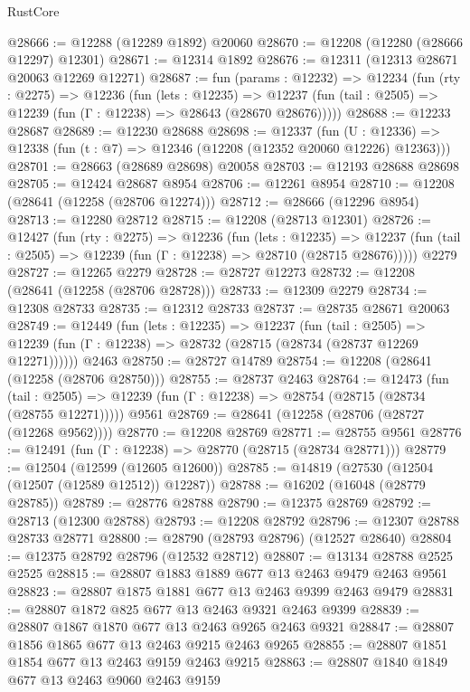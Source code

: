 \begin{lexlean}{RustCore}
\begin{coremodule}
@28666 := @12288 (@12289 @1892) @20060
@28670 := @12208 (@12280 (@28666 @12297) @12301)
@28671 := @12314 @1892
@28676 := @12311 (@12313 @28671 @20063 @12269 @12271)
@28687 := fun (params : @12232) =>
  @12234
    (fun (rty : @2275) =>
    @12236
      (fun (lets : @12235) =>
      @12237 (fun (tail : @2505) => @12239 (fun (Γ : @12238) => @28643 (@28670 @28676)))))
@28688 := @12233 @28687
@28689 := @12230 @28688
@28698 := @12337
    (fun (U : @12336) => @12338 (fun (t : @7) => @12346 (@12208 (@12352 @20060 @12226) @12363)))
@28701 := @28663 (@28689 @28698) @20058
@28703 := @12193 @28688 @28698
@28705 := @12424 @28687 @8954
@28706 := @12261 @8954
@28710 := @12208 (@28641 (@12258 (@28706 @12274)))
@28712 := @28666 (@12296 @8954)
@28713 := @12280 @28712
@28715 := @12208 (@28713 @12301)
@28726 := @12427
    (fun (rty : @2275) =>
    @12236
      (fun (lets : @12235) =>
      @12237 (fun (tail : @2505) => @12239 (fun (Γ : @12238) => @28710 (@28715 @28676)))))
    @2279
@28727 := @12265 @2279
@28728 := @28727 @12273
@28732 := @12208 (@28641 (@12258 (@28706 @28728)))
@28733 := @12309 @2279
@28734 := @12308 @28733
@28735 := @12312 @28733
@28737 := @28735 @28671 @20063
@28749 := @12449
    (fun (lets : @12235) =>
    @12237
      (fun (tail : @2505) =>
      @12239 (fun (Γ : @12238) => @28732 (@28715 (@28734 (@28737 @12269 @12271))))))
    @2463
@28750 := @28727 @14789
@28754 := @12208 (@28641 (@12258 (@28706 @28750)))
@28755 := @28737 @2463
@28764 := @12473
    (fun (tail : @2505) => @12239 (fun (Γ : @12238) => @28754 (@28715 (@28734 (@28755 @12271)))))
    @9561
@28769 := @28641 (@12258 (@28706 (@28727 (@12268 @9562))))
@28770 := @12208 @28769
@28771 := @28755 @9561
@28776 := @12491 (fun (Γ : @12238) => @28770 (@28715 (@28734 @28771)))
@28779 := @12504 (@12599 (@12605 @12600))
@28785 := @14819 (@27530 (@12504 (@12507 (@12589 @12512)) @12287))
@28788 := @16202 (@16048 (@28779 @28785))
@28789 := @28776 @28788
@28790 := @12375 @28769
@28792 := @28713 (@12300 @28788)
@28793 := @12208 @28792
@28796 := @12307 @28788 @28733 @28771
@28800 := @28790 (@28793 @28796) (@12527 @28640)
@28804 := @12375 @28792 @28796 (@12532 @28712)
@28807 := @13134 @28788 @2525 @2525
@28815 := @28807 @1883 @1889 @677 @13 @2463 @9479 @2463 @9561
@28823 := @28807 @1875 @1881 @677 @13 @2463 @9399 @2463 @9479
@28831 := @28807 @1872 @825 @677 @13 @2463 @9321 @2463 @9399
@28839 := @28807 @1867 @1870 @677 @13 @2463 @9265 @2463 @9321
@28847 := @28807 @1856 @1865 @677 @13 @2463 @9215 @2463 @9265
@28855 := @28807 @1851 @1854 @677 @13 @2463 @9159 @2463 @9215
@28863 := @28807 @1840 @1849 @677 @13 @2463 @9060 @2463 @9159

\end{coremodule}
\end{lexlean}
